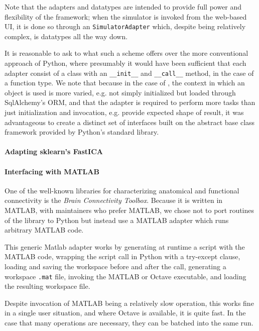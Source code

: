 Note that the adapters and datatypes are intended to provide full 
power and flexibility of the framework; when the simulator is invoked from
the web-based UI, it is done so through an \texttt{SimulatorAdapter} which,
despite being relatively complex, is datatypes all the way down.

It is reasonable to ask to what such a scheme offers over the more 
conventional approach of Python, where presumably it would have been
sufficient that each adapter consist of a class with an \texttt{\_\_init\_\_}
and \texttt{\_\_call\_\_} method, in the case of a function type. 
We note that because in the case of \TVB, the context in which an object
is used is more varied, e.g. not simply initialized but loaded through 
SqlAlchemy's ORM, and that the adapter is required to perform more tasks
than just initialization and invocation, e.g. provide expected shape of 
result, it was advantageous to create a distinct set of interfaces built
on the abstract base class framework provided by Python's standard library.

\paragraph{Adapting sklearn's FastICA}


\paragraph{Interfacing with MATLAB}

One of the well-known libraries for characterizing anatomical 
and functional connectivity is the \emph{Brain Connectivity Toolbox}. 
Because it is written in MATLAB, with maintainers who prefer MATLAB, we 
chose not to port routines of the library to Python but instead use
a MATLAB adapter which runs arbitrary MATLAB code. 

This generic Matlab adapter works by generating at runtime a script with the MATLAB code, 
wrapping the script call in Python with a try-except clause,  
loading and saving the workspace before and after the call,
generating a workspace \texttt{.mat} file, invoking the MATLAB or Octave
executable, and loading the resulting workspace file. 

Despite invocation of MATLAB being a relatively slow operation, this works fine in a single
user situation, and where Octave is available, it is quite fast. In the 
case that many operations are necessary, they can be batched into the 
same run.


